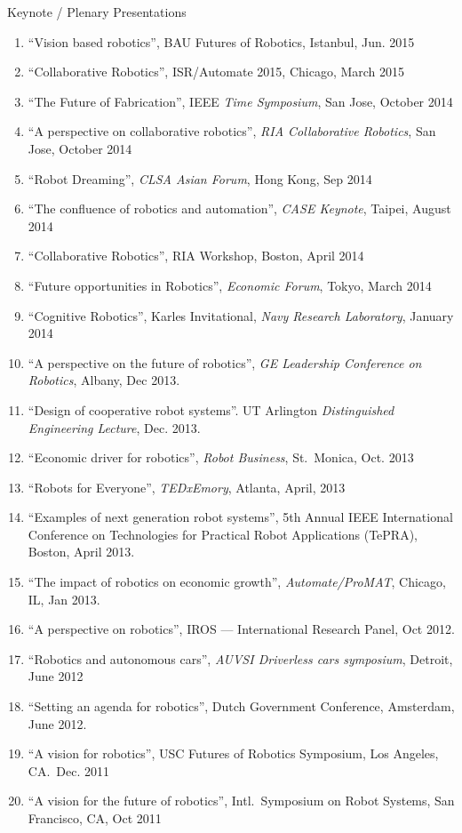 \documentclass{article}
\begin{document}
\begin{cv}
\begin{cvlist}{Keynote / Plenary Presentations}
\begin{enumerate}
  \item ``Vision based robotics'', BAU Futures of Robotics, Istanbul, Jun. 2015
  \item ``Collaborative Robotics'', ISR/Automate 2015, Chicago, March 2015
  \item ``The Future of Fabrication'', IEEE {\em Time Symposium}, San Jose, October 2014
  \item ``A perspective on collaborative robotics'', {\em RIA Collaborative Robotics}, San Jose, October 2014
  \item ``Robot Dreaming'', {\em CLSA Asian Forum}, Hong Kong, Sep 2014
  \item ``The confluence of robotics and automation'', {\em CASE Keynote}, Taipei, August 2014
  \item ``Collaborative Robotics'', RIA Workshop, Boston, April 2014
  \item ``Future opportunities in Robotics'', {\em Economic Forum}, Tokyo, March 2014
  \item ``Cognitive Robotics'', Karles Invitational, {\em Navy Research Laboratory}, January 2014
  \item ``A perspective on the future of robotics'', {\em GE Leadership Conference on Robotics}, Albany, Dec 2013.
  \item ``Design of cooperative robot systems''. UT Arlington {\em Distinguished Engineering Lecture}, Dec. 2013.
  \item ``Economic driver for robotics'', {\em Robot Business}, St.\ Monica,  Oct. 2013
  \item ``Robots for Everyone'', {\em TEDxEmory}, Atlanta, April, 2013
  \item ``Examples of next generation robot systems'', 5th Annual IEEE
    International Conference on Technologies for Practical Robot
    Applications (TePRA), Boston, April 2013.
  \item ``The impact of robotics on economic growth'', {\em Automate/ProMAT}, Chicago, IL, Jan 2013.
  \item ``A perspective on robotics'', IROS --- International Research  Panel, Oct 2012.
  \item ``Robotics and autonomous cars'', {\em AUVSI Driverless cars symposium}, Detroit, June 2012
  \item ``Setting an agenda for robotics'', Dutch Government  Conference, Amsterdam, June 2012.
  \item ``A vision for robotics'', USC Futures of Robotics Symposium, Los Angeles, CA.\  Dec. 2011
    \item ``A vision for the future of robotics'', Intl.\ Symposium on Robot Systems, San Francisco, CA, Oct 2011

\end{enumerate}
\end{cvlist}
\end{cv}
\end{document}
